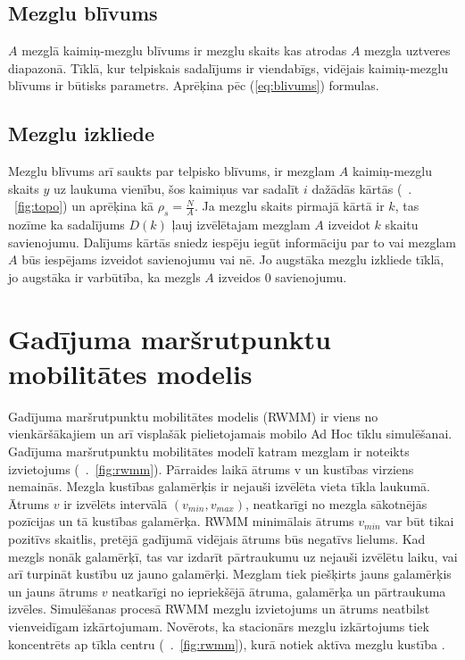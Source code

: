 \subsection{Mezglu blīvums}
$A$ mezglā kaimiņ-mezglu blīvums ir mezglu skaits kas atrodas $A$ mezgla uztveres diapazonā. Tīklā, kur telpiskais sadalījums ir viendabīgs, vidējais kaimiņ-mezglu blīvums ir būtisks parametrs. Aprēķina pēc (\ref{eq:blivums}) formulas.

\subsection{Mezglu izkliede}
Mezglu blīvums arī saukts par telpisko blīvums, ir mezglam $A$ kaimiņ-mezglu skaits $y$ uz laukuma vienību, šos kaimiņus var sadalīt $i$ dažādās kārtās (\seename~\figurename. ~\ref{fig:topo}) un aprēķina kā $\rho_{s}=\frac{N}{A}$. Ja mezglu skaits pirmajā kārtā ir $k$, tas nozīme ka sadalījums $D(k)$ ļauj izvēlētajam mezglam $A$ izveidot $k$ skaitu savienojumu. Dalījums kārtās sniedz iespēju iegūt informāciju par to vai mezglam $A$ būs iespējams izveidot savienojumu vai nē. Jo augstāka mezglu izkliede tīklā, jo augstāka ir varbūtība, ka mezgls $A$ izveidos 0 savienojumu.


\section{Gadījuma maršrutpunktu mobilitātes modelis}
Gadījuma maršrutpunktu mobilitātes modelis (\acs{RWMM}) ir viens no vienkāršākajiem un arī visplašāk pielietojamais mobilo Ad Hoc tīklu simulēšanai. Gadījuma maršrutpunktu mobilitātes modelī katram mezglam ir noteikts izvietojums (\seename~\figurename.~\ref{fig:rwmm}). Pārraides laikā ātrums \gls{v} un kustības virziens nemainās. Mezgla kustības galamērķis ir nejauši izvēlēta vieta tīkla laukumā. Ātrums $v$ ir izvēlēts intervālā $(v_{min}, v_{max})$, neatkarīgi no mezgla sākotnējās pozīcijas un tā kustības galamērķa. RWMM minimālais ātrums $v_{min}$ var būt tikai pozitīvs skaitlis, pretējā gadījumā vidējais ātrums būs negatīvs lielums. Kad mezgls nonāk galamērķī, tas var izdarīt pārtraukumu uz nejauši izvēlētu laiku, vai arī turpināt kustību uz jauno galamērķi. Mezglam tiek piešķirts jauns galamērķis un jauns ātrums $v$ neatkarīgi no iepriekšējā ātruma, galamērķa un pārtraukuma izvēles. Simulēšanas procesā RWMM mezglu izvietojums un ātrums neatbilst vienveidīgam izkārtojumam. Novērots, ka stacionārs mezglu izkārtojums tiek koncentrēts ap tīkla centru (\seename~\figurename.~\ref{fig:rwmm}), kurā notiek aktīva mezglu kustība \citep{bett, navid}.


